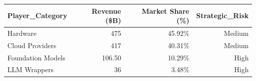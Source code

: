 

\begin{tabular}{@{}lrrr@{}}
\toprule
Player\_Category & Revenue (\$B) & Market Share (\%) & Strategic\_Risk \\
\midrule
Hardware & 475 & 45.92\% & Medium \\
Cloud Providers & 417 & 40.31\% & Medium \\
Foundation Models & 106.50 & 10.29\% & High \\
LLM Wrappers & 36 & 3.48\% & High \\
\bottomrule
\end{tabular}